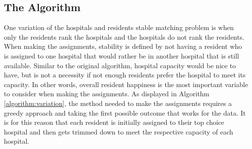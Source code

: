 \documentclass[letterpaper, 10pt,DIV=13]{scrartcl}
\numberwithin{equation}{section} %
\numberwithin{figure}{section} %
\numberwithin{table}{section} %
\begin{document}
\subsection{The Algorithm}
One variation of the hospitals and residents stable matching problem is when only the residents rank the hospitals and the hospitals do not rank the residents. When making the assignments, stability is defined by not having a resident who is assigned to one hospital that would rather be in another hospital that is still available. Similar to the original algorithm, hospital capacity would be nice to have, but is not a necessity if not enough residents prefer the hospital to meet its capacity. In other words, overall resident happiness is the most important variable to consider when making the assignments. As displayed in Algorithm \ref{algorithm:variation}, the method needed to make the assignments requires a greedy approach and taking the first possible outcome that works for the data. It is for this reason that each resident is initially assigned to their top choice hospital and then gets trimmed down to meet the respective capacity of each hospital.
\end{document}

